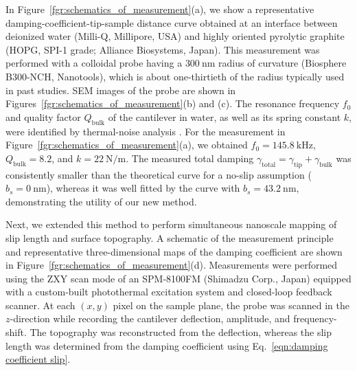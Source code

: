 \documentclass[journal=jacsat,manuscript=article]{achemso}
\begin{document}
In Figure~\ref{fgr:schematics_of_measurement}(a), we show a representative damping-coefficient-tip-sample distance curve obtained at an interface between deionized water (Milli-Q, Millipore, USA) and highly oriented pyrolytic graphite (HOPG, SPI-1 grade; Alliance Biosystems, Japan). This measurement was performed with a colloidal probe having a \(\SI{300}{\nano\metre}\) radius of curvature (Biosphere B300-NCH, Nanotools), which is about one-thirtieth of the radius typically used in past studies. SEM images of the probe are shown in Figures~\ref{fgr:schematics_of_measurement}(b) and (c). The resonance frequency \(f_0\) and quality factor \(Q_{\text{bulk}}\) of the cantilever in water, as well as its spring constant \(k\), were identified by thermal-noise analysis \cite{Butt1995-nx, Pottier2017-ch}. For the measurement in Figure~\ref{fgr:schematics_of_measurement}(a), we obtained \(f_0 = \SI{145.8}{\kilo\hertz}\), \(Q_{\text{bulk}} = 8.2\), and \(k = \SI{22}{\newton\per\metre}\). The measured total damping \(\gamma_{\text{total}}=\gamma_{\text{tip}}+\gamma_{\text{bulk}}\) was consistently smaller than the theoretical curve for a no-slip assumption (\(b_s = \SI{0}{\nano\metre}\)), whereas it was well fitted by the curve with \(b_s = \SI{43.2}{\nano\metre}\), demonstrating the utility of our new method.

Next, we extended this method to perform simultaneous nanoscale mapping of slip length and surface topography. A schematic of the measurement principle and representative three-dimensional maps of the damping coefficient are shown in Figure~\ref{fgr:schematics_of_measurement}(d). Measurements were performed using the ZXY scan mode of an SPM-8100FM (Shimadzu Corp., Japan) equipped with a custom-built photothermal excitation system and closed-loop feedback scanner. At each \((x, y)\) pixel on the sample plane, the probe was scanned in the \(z\)-direction while recording the cantilever deflection, amplitude, and frequency-shift. The topography was reconstructed from the deflection, whereas the slip length was determined from the damping coefficient using Eq.~\ref{eqn:damping coefficient slip}. 
\end{document}

